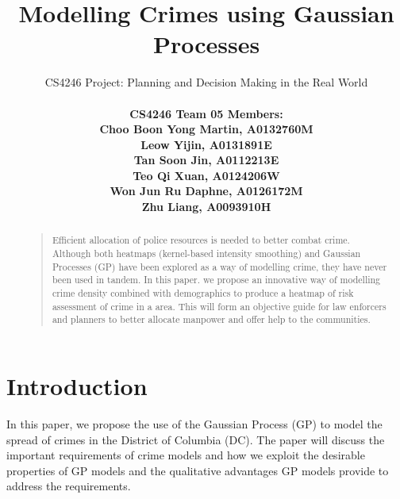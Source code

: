 \documentclass[letterpaper]{article}
\begin{document}
	\title{Modelling Crimes using Gaussian Processes}
	\author{CS4246 Project: Planning and Decision Making in the Real World  \\ \\
	\bf \small CS4246 Team 05 Members:\\
	\small Choo Boon Yong Martin, A0132760M\\
	\small Leow Yijin, A0131891E\\
	\small Tan Soon Jin, A0112213E\\
	\small Teo Qi Xuan, A0124206W\\
	\small Won Jun Ru Daphne, A0126172M\\
	\small Zhu Liang, A0093910H\\
	}	
	
	
	\maketitle
	\thispagestyle{empty}
	\pagestyle{empty}
	
	
	
	\begin{abstract}
	\begin{quote}
		Efficient allocation of police resources is needed to better combat crime. Although both heatmaps (kernel-based intensity smoothing) and Gaussian Processes (GP) have been explored as a way of modelling crime, they have never been used in tandem. 
		In this paper. we propose an innovative way of modelling crime density combined with  demographics to produce a heatmap of risk assessment of crime in a area. This will form an objective guide for law enforcers and planners to better allocate manpower and offer help to the communities.
	\end{quote}
	\end{abstract}
	
	
	\section{Introduction}
	
	In this paper, we propose the use of the Gaussian Process (GP) to model the spread of crimes in the District of Columbia (DC).
	The paper will discuss the important requirements of crime models and how we exploit the desirable properties of GP models and the qualitative advantages GP models provide to address the requirements.\\ \\
\end{document}
